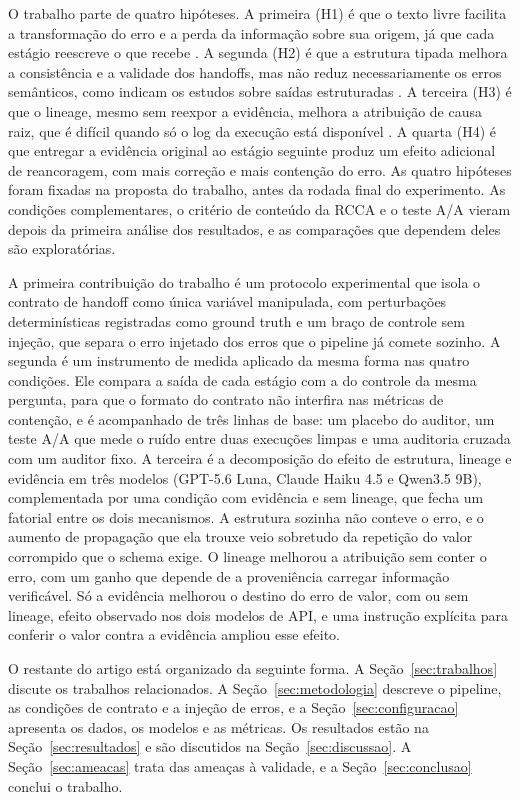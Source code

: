 O trabalho parte de quatro hipóteses.
A primeira (H1) é que o texto livre facilita a transformação do erro e a perda da informação sobre sua origem, já que cada estágio reescreve o que recebe \cite{singh2026snowball}.
A segunda (H2) é que a estrutura tipada melhora a consistência e a validade dos handoffs, mas não reduz necessariamente os erros semânticos, como indicam os estudos sobre saídas estruturadas \cite{ray2026constraint, tam2024speak}.
A terceira (H3) é que o lineage, mesmo sem reexpor a evidência, melhora a atribuição de causa raiz, que é difícil quando só o log da execução está disponível \cite{zhang2025which}.
A quarta (H4) é que entregar a evidência original ao estágio seguinte produz um efeito adicional de reancoragem, com mais correção e mais contenção do erro.
As quatro hipóteses foram fixadas na proposta do trabalho, antes da rodada final do experimento.
As condições complementares, o critério de conteúdo da RCCA e o teste A/A vieram depois da primeira análise dos resultados, e as comparações que dependem deles são exploratórias.

A primeira contribuição do trabalho é um protocolo experimental que isola o contrato de handoff como única variável manipulada, com perturbações determinísticas registradas como ground truth e um braço de controle sem injeção, que separa o erro injetado dos erros que o pipeline já comete sozinho. A segunda é um instrumento de medida aplicado da mesma forma nas quatro condições. Ele compara a saída de cada estágio com a do controle da mesma pergunta, para que o formato do contrato não interfira nas métricas de contenção, e é acompanhado de três linhas de base: um placebo do auditor, um teste A/A que mede o ruído entre duas execuções limpas e uma auditoria cruzada com um auditor fixo. A terceira é a decomposição do efeito de estrutura, lineage e evidência em três modelos (GPT-5.6 Luna, Claude Haiku 4.5 e Qwen3.5 9B), complementada por uma condição com evidência e sem lineage, que fecha um fatorial entre os dois mecanismos. A estrutura sozinha não conteve o erro, e o aumento de propagação que ela trouxe veio sobretudo da repetição do valor corrompido que o schema exige. O lineage melhorou a atribuição sem conter o erro, com um ganho que depende de a proveniência carregar informação verificável. Só a evidência melhorou o destino do erro de valor, com ou sem lineage, efeito observado nos dois modelos de API, e uma instrução explícita para conferir o valor contra a evidência ampliou esse efeito.

O restante do artigo está organizado da seguinte forma.
A Seção~\ref{sec:trabalhos} discute os trabalhos relacionados.
A Seção~\ref{sec:metodologia} descreve o pipeline, as condições de contrato e a injeção de erros, e a Seção~\ref{sec:configuracao} apresenta os dados, os modelos e as métricas.
Os resultados estão na Seção~\ref{sec:resultados} e são discutidos na Seção~\ref{sec:discussao}.
A Seção~\ref{sec:ameacas} trata das ameaças à validade, e a Seção~\ref{sec:conclusao} conclui o trabalho.
